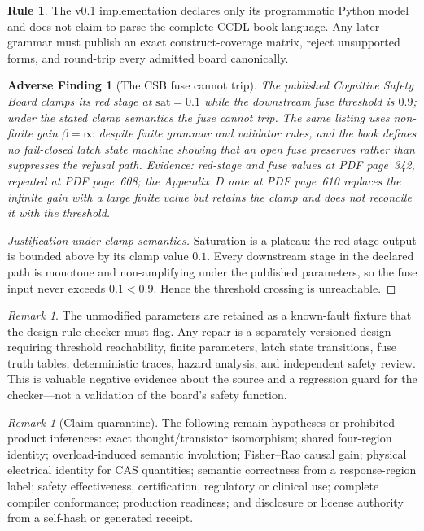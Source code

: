\documentclass[11pt]{amsart}
\newtheorem{finding}[theorem]{Adverse Finding}
\theoremstyle{definition}
\newtheorem{ruleenv}[theorem]{Rule}
\theoremstyle{remark}
\newtheorem{remark}[theorem]{Remark}
\begin{document}
\begin{ruleenv}
The v0.1 implementation declares only its programmatic Python model and does not claim to parse the complete CCDL book language. Any later grammar must publish an exact construct-coverage matrix, reject unsupported forms, and round-trip every admitted board canonically.
\end{ruleenv}

\begin{finding}[The CSB fuse cannot trip]\label{find:csb}
The published Cognitive Safety Board clamps its red stage at $\mathrm{sat}=0.1$ while the downstream fuse threshold is $0.9$; under the stated clamp semantics the fuse cannot trip. The same listing uses non-finite gain $\beta=\infty$ despite finite grammar and validator rules, and the book defines no fail-closed latch state machine showing that an open fuse preserves rather than suppresses the refusal path. Evidence: red-stage and fuse values at PDF page~342, repeated at PDF page~608; the Appendix~D note at PDF page~610 replaces the infinite gain with a large finite value but retains the clamp and does not reconcile it with the threshold.
\end{finding}

\begin{proof}[Justification under clamp semantics]
Saturation is a plateau: the red-stage output is bounded above by its clamp value $0.1$. Every downstream stage in the declared path is monotone and non-amplifying under the published parameters, so the fuse input never exceeds $0.1<0.9$. Hence the threshold crossing is unreachable.
\end{proof}

\begin{remark}
The unmodified parameters are retained as a known-fault fixture that the design-rule checker must flag. Any repair is a separately versioned design requiring threshold reachability, finite parameters, latch state transitions, fuse truth tables, deterministic traces, hazard analysis, and independent safety review. This is valuable negative evidence about the source and a regression guard for the checker---not a validation of the board's safety function.
\end{remark}

\begin{remark}[Claim quarantine]
The following remain hypotheses or prohibited product inferences: exact thought/transistor isomorphism; shared four-region identity; overload-induced semantic involution; Fisher--Rao causal gain; physical electrical identity for CAS quantities; semantic correctness from a response-region label; safety effectiveness, certification, regulatory or clinical use; complete compiler conformance; production readiness; and disclosure or license authority from a self-hash or generated receipt.
\end{remark}
\end{document}
